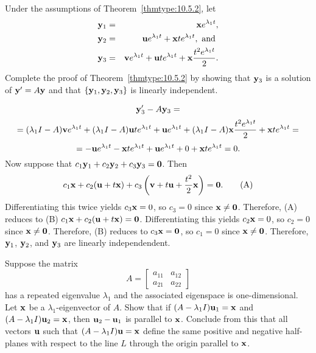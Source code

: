 \documentclass{ximera}
\begin{document}
 \begin{problem}\label{exer:10.5.34}
Under the assumptions of Theorem~\ref{thmtype:10.5.2}, let
\begin{eqnarray*}
{\bf y}_1 &=&{\bf x} e^{\lambda_1t},\\
{\bf y}_2&=&{\bf u}e^{\lambda_1t}+{\bf x} te^{\lambda_1t},\mbox{
and }\\
{\bf y}_3&=&{\bf v}e^{\lambda_1t}+{\bf u}te^{\lambda_1t}+{\bf
x} \frac{t^2e^{\lambda_1t} }{2}.
\end{eqnarray*}
Complete the proof of Theorem~\ref{thmtype:10.5.2} by showing
that ${\bf y}_3$ is a solution of ${\bf y}'=A{\bf y}$ and
that $\{{\bf y}_1,{\bf y}_2,{\bf y}_3\}$ is linearly independent.

\begin{solution}
    $$
{\bf y}_3'-A{\bf y}_3=$$
$$=(\lambda_1I-A){\bf v}e^{\lambda_1t}
+(\lambda_1I-A){\bf u}te^{\lambda_1t}+{\bf u}e^{\lambda_1t}+(\lambda_1I-A){\bf x}{t^2e^{\lambda_1t}\over2}+{\bf
x}te^{\lambda_1t}=$$
$$=-{\bf u}e^{\lambda_1t}-{\bf x}te^{\lambda_1t}+{\bf
u}e^{\lambda_1t}+0+{\bf x}te^{\lambda_1t}=0.
$$
Now suppose that $c_1{\bf y}_1+c_2{\bf y}_2+c_3{\bf y}_3={\bf 0}$.
Then
$$
 c_1{\bf x}+c_2({\bf u}+t{\bf x})+c_3\left({\bf
v}+t{\bf u}+{t^2\over2}{\bf x}\right)={\bf 0}.
\quad\quad\text{(A)}
$$
Differentiating this twice yields $c_3{\bf x}=0$, so $c_3=0$ since
${\bf x}\ne{\bf 0}$. Therefore, (A) reduces to
(B) $c_1{\bf x}+c_2({\bf u}+t{\bf x})={\bf 0}$.
Differentiating this yields $c_2{\bf x}=0$, so $c_2=0$ since
${\bf x}\neq{\bf 0}$. Therefore, (B) reduces to $c_3{\bf x}={\bf 0}$,
so $c_1=0$ since
${\bf x}\neq {\bf 0}$. Therefore,${\bf y}_1$, ${\bf y}_2$, and ${\bf
y}_3$ are linearly independendent.
\end{solution}
 \end{problem}

 \begin{problem}\label{exer:10.5.35}
Suppose the matrix
$$
A= \begin{bmatrix}a_{11}&a_{12}\\a_{21}&a_{22}
\end{bmatrix}
$$
has a repeated eigenvalue $\lambda_1$ and the associated eigenspace is
one-dimensional. Let
 ${\bf x}$ be a $\lambda_1$-eigenvector of $A$.
Show that if
$(A-\lambda_1I){\bf u}_1={\bf x}$ and
$(A-\lambda_1I){\bf u}_2={\bf x}$, then ${\bf u}_2-{\bf u}_1$
is parallel to ${\bf x}$. Conclude from this that all vectors ${\bf
u}$
such that $(A-\lambda_1I){\bf u}={\bf x}$ define the same positive and
negative half-planes with respect to the line $L$
 through the origin parallel to ${\bf x}$.
  \end{problem}
\end{document}
